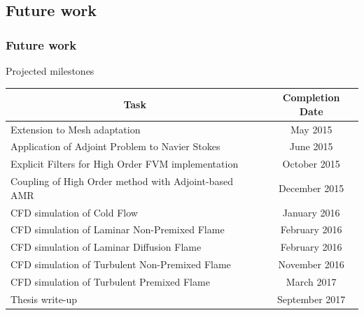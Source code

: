 \documentclass{beamer}
\begin{document}
\subsection[Future]{Future work}
\begin{frame}%
\frametitle{Future work}
\scriptsize


\begin{minipage}[t][1\textheight]{1\textwidth}
\vspace{-20pt}
\begin{exampleblock}{Projected milestones}

\begin{tabular}{|l|c|} \hline
\multicolumn{1}{|c|}{\bf{Task}} & \multicolumn{1}{|c|}{\bf{Completion Date}} \\

\hline Extension to Mesh adaptation & May 2015\\

\hline Application of Adjoint Problem to Navier Stokes  & June 2015\\

\hline Explicit Filters for High Order FVM implementation  & October 2015\\

\hline Coupling of High Order method with Adjoint-based AMR & December 2015\\

\hline CFD simulation of Cold Flow & January 2016\\

\hline CFD simulation of Laminar Non-Premixed Flame & February 2016\\

\hline CFD simulation of Laminar Diffusion Flame & February 2016\\

\hline CFD simulation of Turbulent Non-Premixed Flame & November 2016\\

\hline CFD simulation of Turbulent Premixed Flame & March 2017\\

\hline Thesis write-up & September 2017 \\ 

\hline

\end{tabular}

\end{exampleblock}
\end{minipage}

\end{frame}
\end{document}
